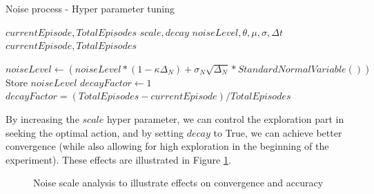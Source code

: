 \begin{algorithm}
\caption{Noise process - Hyper parameter tuning}
\label{alg:NoisePolicy}
\begin{algorithmic}[1]
\Require
\Statex $currentEpisode,TotalEpisodes$
\Statex $scale,decay$ 
\Statex $noiseLevel,\theta,\mu,\sigma,\Delta t$ 
\Statex $currentEpisode,TotalEpisodes$

\Statex
\State  $noiseLevel \gets \left(
            noiseLevel 
            *(1-\kappa\Delta_N) 
    + \sigma_N \sqrt{\Delta_N}*StandardNormalVariable() 
        \right)$
\State Store $noiseLevel$
\State $decayFactor \gets 1$
    \State $decayFactor = (TotalEpisodes-currentEpisode)/TotalEpisodes$
\EndIf
\State {}

\end{algorithmic}
\end{algorithm}

By increasing the $scale$  hyper parameter, we can control the exploration part in seeking the optimal action, and by setting $decay$ to True, we can achieve better convergence (while also allowing for high exploration in the beginning of the experiment). These effects are illustrated in Figure \ref{fig:noise_analysis}.

\begin{figure}[H]
  \centering
  \vfill
  \vfill
  \caption{Noise scale analysis to illustrate effects on convergence and accuracy}
  \label{fig:noise_analysis}
\end{figure}

